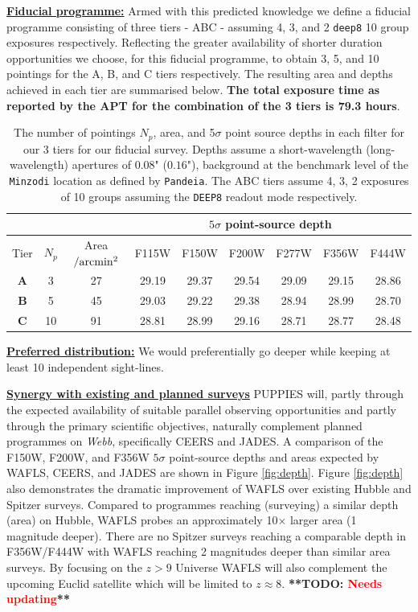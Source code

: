 \documentclass[12pt]{article}
\newcommand{\todo}[1]{\textbf{**TODO: \textcolor{red}{#1}**}}
\begin{document}
\noindent
\underline{\bf Fiducial programme:} Armed with this predicted knowledge we define a fiducial programme consisting of three tiers - ABC - assuming 4, 3, and 2 \texttt{deep8} 10 group exposures respectively. Reflecting the greater availability of shorter duration opportunities we choose, for this fiducial programme, to obtain 3, 5, and 10 pointings for the A, B, and C tiers respectively. The resulting area and depths achieved in each tier are summarised below. \textbf{The total exposure time as reported by the APT for the combination of the 3 tiers is 79.3 hours}.

\begin{table}[h!]
\footnotesize
\begin{center}
\begin{tabular}{ |c|c|c|c|c|c|c|c|c| } 
\hline
\multicolumn{3}{|c|}{} & \multicolumn{6}{|c|}{$5\sigma$ point-source depth} \\
 \hline
Tier & $N_{p}$ & Area$/{\rm arcmin^2}$ & F115W & F150W & F200W & F277W & F356W & F444W \\
\hline
\textbf{A} & 3 & 27 & 29.19 & 29.37 & 29.54 & 29.09 & 29.15 & 28.86 \\
\textbf{B} & 5 & 45 & 29.03 & 29.22 & 29.38 & 28.94 & 28.99 & 28.70 \\
\textbf{C} & 10 & 91 & 28.81 & 28.99 & 29.16 & 28.71 & 28.77 & 28.48 \\
\hline
\end{tabular}
\end{center}
\vspace{-5mm}
\caption{The number of pointings $N_p$, area, and 5$\sigma$ point source depths in each filter for our 3 tiers for our fiducial survey.  Depths assume a short-wavelength (long-wavelength) apertures of $0.08$" ($0.16$"), background at the benchmark level of the \texttt{Minzodi} location as defined by \texttt{Pandeia}. The ABC tiers assume 4, 3, 2 exposures of 10 groups assuming the \texttt{DEEP8} readout mode respectively.}
\end{table}

\noindent
\underline{\bf Preferred distribution:} We would preferentially go deeper while keeping at least 10 independent sight-lines. 


\noindent
\underline{\bf Synergy with existing and planned surveys} PUPPIES will, partly through the expected availability of suitable parallel observing opportunities and partly through the primary scientific objectives, naturally complement planned programmes on \emph{Webb}, specifically CEERS and JADES. A comparison of the F150W, F200W, and F356W $5\sigma$ point-source depths and areas expected by WAFLS, CEERS, and JADES are shown in Figure \ref{fig:depth}. Figure \ref{fig:depth} also demonstrates the dramatic improvement of WAFLS over existing Hubble and Spitzer surveys. Compared to programmes reaching (surveying) a similar depth (area) on Hubble, WAFLS probes an approximately 10$\times$ larger area (1 magnitude deeper). There are no Spitzer surveys reaching a comparable depth in F356W/F444W with WAFLS reaching 2 magnitudes deeper than similar area surveys. By focusing on the $z>9$ Universe WAFLS will also complement the upcoming Euclid satellite which will be limited to $z\approx 8$. \todo{Needs updating}
\end{document}
